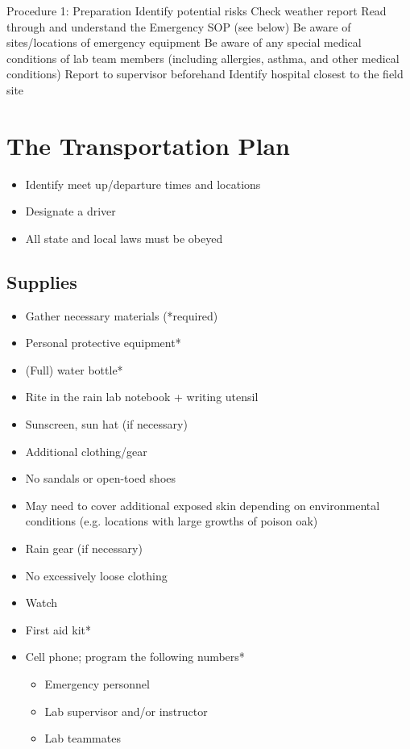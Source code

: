\documentclass[12pt]{../SOP2}
\begin{document}
Procedure 1: Preparation
Identify potential risks
Check weather report
Read through and understand the Emergency SOP (see below)
Be aware of sites/locations of emergency equipment
Be aware of any special medical conditions of lab team members (including allergies, asthma, and other medical conditions)
Report to supervisor beforehand
Identify hospital closest to the field site


\section{The Transportation Plan}

\begin{itemize}
  \item Identify meet up/departure times and locations
  \item Designate a driver
  \item All state and local laws must be obeyed
\end{itemize}

\subsection{Supplies}

\begin{itemize}
  \item Gather necessary materials (*required)
  \item Personal protective equipment*
  \item (Full) water bottle*
  \item Rite in the rain lab notebook + writing utensil
  \item Sunscreen, sun hat (if necessary)
  \item Additional clothing/gear
  \item No sandals or open-toed shoes
  \item May need to cover additional exposed skin depending on environmental conditions (e.g. locations with large growths of poison oak)
  \item Rain gear (if necessary)
  \item No excessively loose clothing
  \item Watch
  \item First aid kit*
  \item Cell phone; program the following numbers*
\begin{itemize}
  \item Emergency personnel
  \item Lab supervisor and/or instructor
  \item Lab teammates
\end{itemize}
\end{itemize}
\end{document}

